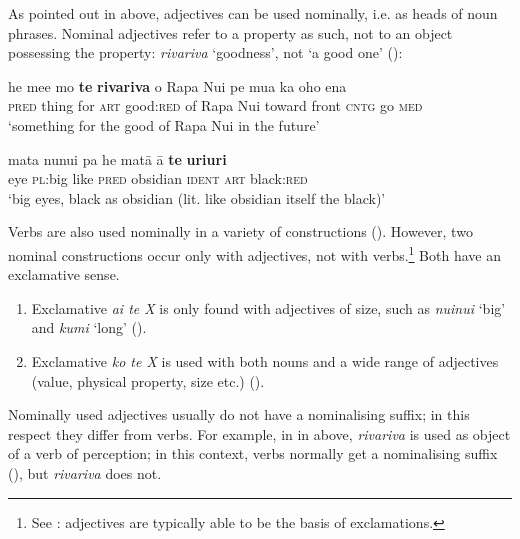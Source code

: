 As pointed out in  above, adjectives can be used nominally, i.e. as heads of noun phrases. Nominal adjectives refer to a property as such, not to an object possessing the property: \textit{rivariva} ‘goodness’, not ‘a good one’ ():

\ea\label{ex:3.107}
\gll he me{\ꞌ}e mo \textbf{te} \textbf{rivariva} o Rapa Nui pe mu{\ꞌ}a ka oho ena\\
\textsc{pred} thing for \textsc{art} good:\textsc{red} of Rapa Nui toward front \textsc{cntg} go \textsc{med}\\

\glt 
‘something for the good of Rapa Nui in the future’ \textstyleExampleref{[R470.011]} 
\z

\ea\label{ex:3.108}
\gll mata nunui pa he matā {\ꞌ}ā \textbf{te} \textbf{{\ꞌ}uri{\ꞌ}uri}\\
eye \textsc{pl}:big like \textsc{pred} obsidian \textsc{ident} \textsc{art} black:\textsc{red}\\

\glt
‘big eyes, black as obsidian (lit. like obsidian itself the black)’ \textstyleExampleref{[R310.021]} 
\z

Verbs are also used nominally in a variety of constructions (). However, two nominal constructions occur only with adjectives, not with verbs.\footnote{\label{fn:136}See \citet[29]{Bhat1994}: adjectives are typically able to be the basis of exclamations.} Both have an exclamative sense.

\begin{enumerate}
\item 
Exclamative \textit{{\ꞌ}ai te X} is only found with adjectives of size, such as \textit{nuinui} ‘big’ and \textit{kumi} ‘long’ ().

\item 
Exclamative \textit{ko te X} is used with both nouns and a wide range of adjectives (value, physical property, size etc.) ().

\end{enumerate}

Nominally used adjectives usually do not have a nominalising suffix; in this respect they differ from verbs. For example, in  in  above, \textit{rivariva} is used as object of a verb of perception; in this context, verbs normally get a nominalising suffix (), but \textit{rivariva} does not.


